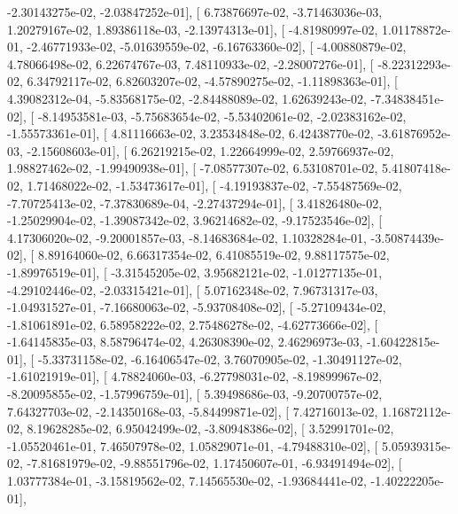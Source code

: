 \documentclass{article}
\begin{document}
         -2.30143275e-02,  -2.03847252e-01],
       [  6.73876697e-02,  -3.71463036e-03,   1.20279167e-02,
          1.89386118e-03,  -2.13974313e-01],
       [ -4.81980997e-02,   1.01178872e-01,  -2.46771933e-02,
         -5.01639559e-02,  -6.16763360e-02],
       [ -4.00880879e-02,   4.78066498e-02,   6.22674767e-03,
          7.48110933e-02,  -2.28007276e-01],
       [ -8.22312293e-02,   6.34792117e-02,   6.82603207e-02,
         -4.57890275e-02,  -1.11898363e-01],
       [  4.39082312e-04,  -5.83568175e-02,  -2.84488089e-02,
          1.62639243e-02,  -7.34838451e-02],
       [ -8.14953581e-03,  -5.75683654e-02,  -5.53402061e-02,
         -2.02383162e-02,  -1.55573361e-01],
       [  4.81116663e-02,   3.23534848e-02,   6.42438770e-02,
         -3.61876952e-03,  -2.15608603e-01],
       [  6.26219215e-02,   1.22664999e-02,   2.59766937e-02,
          1.98827462e-02,  -1.99490938e-01],
       [ -7.08577307e-02,   6.53108701e-02,   5.41807418e-02,
          1.71468022e-02,  -1.53473617e-01],
       [ -4.19193837e-02,  -7.55487569e-02,  -7.70725413e-02,
         -7.37830689e-04,  -2.27437294e-01],
       [  3.41826480e-02,  -1.25029904e-02,  -1.39087342e-02,
          3.96214682e-02,  -9.17523546e-02],
       [  4.17306020e-02,  -9.20001857e-03,  -8.14683684e-02,
          1.10328284e-01,  -3.50874439e-02],
       [  8.89164060e-02,   6.66317354e-02,   6.41085519e-02,
          9.88117575e-02,  -1.89976519e-01],
       [ -3.31545205e-02,   3.95682121e-02,  -1.01277135e-01,
         -4.29102446e-02,  -2.03315421e-01],
       [  5.07162348e-02,   7.96731317e-03,  -1.04931527e-01,
         -7.16680063e-02,  -5.93708408e-02],
       [ -5.27109434e-02,  -1.81061891e-02,   6.58958222e-02,
          2.75486278e-02,  -4.62773666e-02],
       [ -1.64145835e-03,   8.58796474e-02,   4.26308390e-02,
          2.46296973e-03,  -1.60422815e-01],
       [ -5.33731158e-02,  -6.16406547e-02,   3.76070905e-02,
         -1.30491127e-02,  -1.61021919e-01],
       [  4.78824060e-03,  -6.27798031e-02,  -8.19899967e-02,
         -8.20095855e-02,  -1.57996759e-01],
       [  5.39498686e-03,  -9.20700757e-02,   7.64327703e-02,
         -2.14350168e-03,  -5.84499871e-02],
       [  7.42716013e-02,   1.16872112e-02,   8.19628285e-02,
          6.95042499e-02,  -3.80948386e-02],
       [  3.52991701e-02,  -1.05520461e-01,   7.46507978e-02,
          1.05829071e-01,  -4.79488310e-02],
       [  5.05939315e-02,  -7.81681979e-02,  -9.88551796e-02,
          1.17450607e-01,  -6.93491494e-02],
       [  1.03777384e-01,  -3.15819562e-02,   7.14565530e-02,
         -1.93684441e-02,  -1.40222205e-01],
\end{document}
